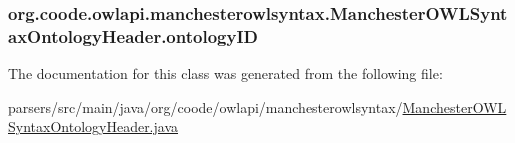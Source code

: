 \hypertarget{classorg_1_1coode_1_1owlapi_1_1manchesterowlsyntax_1_1_manchester_o_w_l_syntax_ontology_header_a6d7dde5caf2e1e00b1b51bb643d5f8ad}{
\subsubsection[{ontology\-I\-D}]{ org.\-coode.\-owlapi.\-manchesterowlsyntax.\-Manchester\-O\-W\-L\-Syntax\-Ontology\-Header.\-ontology\-I\-D\hspace{0.3cm}{\ttfamily [private]}}}\label{classorg_1_1coode_1_1owlapi_1_1manchesterowlsyntax_1_1_manchester_o_w_l_syntax_ontology_header_a6d7dde5caf2e1e00b1b51bb643d5f8ad}


The documentation for this class was generated from the following file\-:\begin{DoxyCompactItemize}
\item 
parsers/src/main/java/org/coode/owlapi/manchesterowlsyntax/\hyperlink{_manchester_o_w_l_syntax_ontology_header_8java}{Manchester\-O\-W\-L\-Syntax\-Ontology\-Header.\-java}\end{DoxyCompactItemize}
